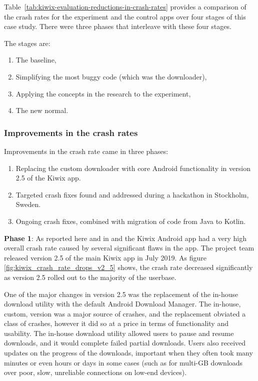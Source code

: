 Table~\ref{tab:kiwix-evaluation-reductions-in-crash-rates} provides a comparison of the crash rates for the experiment and the control apps over four stages of this case study. There were three phases that interleave with these four stages.

The stages are:
\begin{enumerate}
    \itemsep0em
    \item The baseline,
    \item Simplifying the most buggy code (which was the downloader),
    \item Applying the concepts in the research to the experiment,
    \item The new normal.
\end{enumerate}

\subsubsection{Improvements in the crash rates}
Improvements in the crash rate came in three phases:
\begin{enumerate}
    \itemsep0em
    \item Replacing the custom downloader with core Android functionality in version 2.5 of the Kiwix app.
    \item Targeted crash fixes found and addressed during a hackathon in Stockholm, Sweden.
    \item Ongoing crash fixes, combined with migration of code from Java to Kotlin.
\end{enumerate}

\textbf{Phase 1}: As reported here and in \cite{harty_google_play_console_insightful_development_using_android_vitals_and_pre_launch_reports} and \cite{harty_better_android_apps_using_android_vitals} the Kiwix Android app had a very high overall crash rate caused by several significant flaws in the app. The project team released version 2.5 of the main Kiwix app in July 2019. As figure \ref{fig:kiwix_crash_rate_drops_v2_5} shows, the crash rate decreased significantly as version 2.5 rolled out to the majority of the userbase. %

One of the major changes in version 2.5 was the replacement of the in-house download utility with the default Android Download Manager\cite{kiwix_release_2_5_0}. The in-house, custom, version was a major source of crashes, and the replacement obviated a class of crashes, however it did so at a price in terms of functionality and usability. The in-house download utility allowed users to pause and resume downloads, and it would complete failed partial downloads. Users also received updates on the progress of the downloads, important when they often took many minutes or even hours or days in some cases (such as for multi-GB downloads over poor, slow, unreliable connections on low-end devices).


